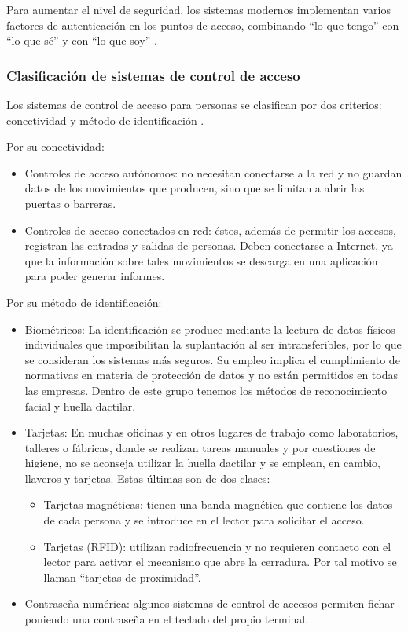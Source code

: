 Para aumentar el nivel de seguridad, los sistemas modernos implementan varios factores de autenticación en los puntos de acceso, combinando ``lo que tengo'' con ``lo que sé'' y con ``lo que soy'' \citep{WEBSITE:ControlAcceso}.

\subsubsection{Clasificación de sistemas de control de acceso}

Los sistemas de control de acceso para personas se clasifican por dos criterios: conectividad y método de identificación \citep{WEBSITE:ControlAccesoPersonas}.

Por su conectividad:

\begin{itemize}
\item Controles de acceso autónomos: no necesitan conectarse a la red y no guardan datos de los movimientos que producen, sino que se limitan a abrir las puertas o barreras. 
\item Controles de acceso conectados en red: éstos, además de permitir los accesos, registran las entradas y salidas de personas. Deben conectarse a Internet, ya que la información sobre tales movimientos se descarga en una aplicación para poder generar informes.
\end{itemize}

Por su método de identificación:

\begin{itemize}
\item Biométricos: La identificación se produce mediante la lectura de datos físicos individuales que imposibilitan la suplantación al ser intransferibles, por lo que se consideran los sistemas más seguros. Su empleo implica el cumplimiento de normativas en materia de protección de datos y no están permitidos en todas las empresas. Dentro de este grupo tenemos los métodos de reconocimiento facial y huella dactilar.
\item Tarjetas: En muchas oficinas y en otros lugares de trabajo como laboratorios, talleres o fábricas, donde se realizan tareas manuales y por cuestiones de higiene, no se aconseja utilizar la huella dactilar y se emplean, en cambio, llaveros y tarjetas. Estas últimas son de dos clases:
	\begin{itemize}
	\item Tarjetas magnéticas: tienen una banda magnética que contiene los datos de cada persona y se introduce en el lector para solicitar el acceso.
	\item Tarjetas (RFID): utilizan radiofrecuencia y no requieren contacto con el lector para activar el mecanismo que abre la cerradura. Por tal motivo se llaman ``tarjetas de proximidad''.
	\end{itemize}
\item Contraseña numérica: algunos sistemas de control de accesos permiten fichar poniendo una contraseña en el teclado del propio terminal.
\end{itemize}

